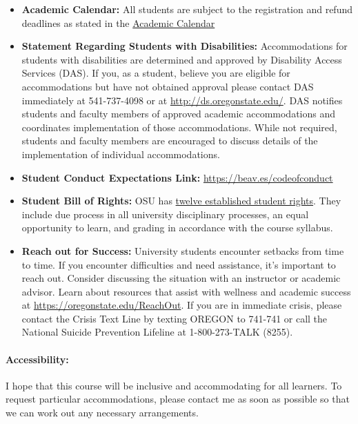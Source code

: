\documentclass[11pt, a4paper]{article}
\begin{document}
\begin{itemize}
\item[] \textbf{Academic Calendar:} All students are subject to the 
registration and refund deadlines as stated in the 
\href{https://registrar.oregonstate.edu/osu-academic-calendar}{Academic Calendar}

\item[] \textbf{Statement Regarding Students with Disabilities:} 
Accommodations for students with disabilities are determined and approved 
by Disability Access Services (DAS). If you, as a student, believe you are 
eligible for accommodations but have not obtained approval please contact 
DAS immediately at 541-737-4098 or at \url{http://ds.oregonstate.edu/}. 
DAS notifies students and faculty members of approved academic accommodations 
and coordinates implementation of those accommodations. While not required, 
students and faculty members are encouraged to discuss details of the 
implementation of individual accommodations.

\item[] \textbf{Student Conduct Expectations Link:} 
\url{https://beav.es/codeofconduct}

\item[] \textbf{Student Bill of Rights:} 
OSU has 
\href{https://asosu.oregonstate.edu/advocacy/rights}{twelve established student rights}. 
They include due process in all 
university disciplinary processes, an equal opportunity to learn, and grading 
in accordance with the course syllabus. 

\item[] \textbf{Reach out for Success:} 
University students encounter setbacks from time to time. If you encounter
 difficulties and need assistance, it’s important to reach out. Consider 
discussing the situation with an instructor or academic advisor. Learn about 
resources that assist with wellness and academic success at
\url{https://oregonstate.edu/ReachOut}. 
If you are in immediate crisis, please contact the Crisis Text Line by texting 
OREGON to 741-741 or call the National Suicide Prevention Lifeline at 
1-800-273-TALK (8255). 
\end{itemize}

\paragraph{Accessibility:} I hope that this course will be inclusive and
accommodating for all learners. 
To request
particular accommodations, please contact me as soon as possible so that we can
work out any necessary arrangements.
\end{document}
